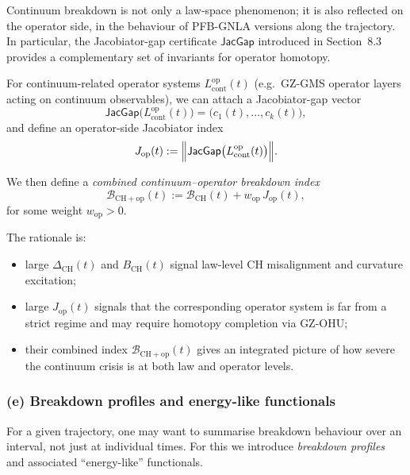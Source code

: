 \documentclass[11pt]{book}
\theoremstyle{plain}
\theoremstyle{definition}
\begin{document}
Continuum breakdown is not only a law-space phenomenon; it is also
reflected on the operator side, in the behaviour of PFB-GNLA versions
along the trajectory. In particular, the Jacobiator-gap certificate
$\mathsf{JacGap}$ introduced in Section~8.3 provides a complementary
set of invariants for operator homotopy.

For continuum-related operator systems $L^{\mathrm{op}}_{\mathrm{cont}}(t)$
(e.g.\ GZ-GMS operator layers acting on continuum observables), we can
attach a Jacobiator-gap vector
\[
   \mathsf{JacGap}\bigl(L^{\mathrm{op}}_{\mathrm{cont}}(t)\bigr)
   =
   \bigl(
     c_1(t),\dots,c_k(t)
   \bigr),
\]
and define an operator-side Jacobiator index
\[
   J_{\mathrm{op}}(t)
   :=
   \Bigl\|
     \mathsf{JacGap}\bigl(L^{\mathrm{op}}_{\mathrm{cont}}(t)\bigr)
   \Bigr\|.
\]

We then define a \emph{combined continuum--operator breakdown index}
\[
   \mathcal{B}_{\mathrm{CH+op}}(t)
   :=
   \mathcal{B}_{\mathrm{CH}}(t)
   +
   w_{\mathrm{op}}\,J_{\mathrm{op}}(t),
\]
for some weight $w_{\mathrm{op}}>0$.

The rationale is:

\begin{itemize}
  \item large $\Delta_{\mathrm{CH}}(t)$ and $B_{\mathrm{CH}}(t)$ signal
        law-level CH misalignment and curvature excitation;
  \item large $J_{\mathrm{op}}(t)$ signals that the corresponding
        operator system is far from a strict regime and may require
        homotopy completion via GZ-OHU;
  \item their combined index
        $\mathcal{B}_{\mathrm{CH+op}}(t)$ gives an integrated picture
        of how severe the continuum crisis is at both law and operator
        levels.
\end{itemize}



\subsubsection*{(e) Breakdown profiles and energy-like functionals}

For a given trajectory, one may want to summarise breakdown behaviour
over an interval, not just at individual times. For this we introduce
\emph{breakdown profiles} and associated “energy-like” functionals.
\end{document}
